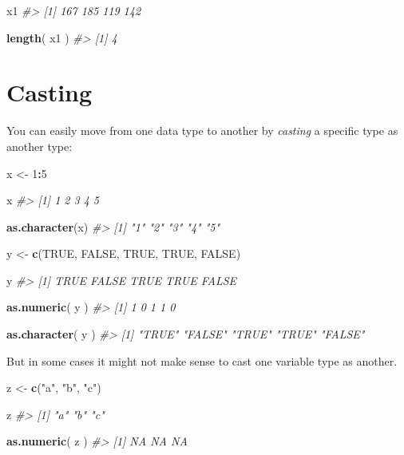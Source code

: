 \documentclass[]{book}
\newenvironment{Shaded}{\begin{snugshade}}{\end{snugshade}}
\newcommand{\CommentTok}[1]{\textcolor[rgb]{0.56,0.35,0.01}{\textit{#1}}}
\newcommand{\DecValTok}[1]{\textcolor[rgb]{0.00,0.00,0.81}{#1}}
\newcommand{\KeywordTok}[1]{\textcolor[rgb]{0.13,0.29,0.53}{\textbf{#1}}}
\newcommand{\NormalTok}[1]{#1}
\newcommand{\OperatorTok}[1]{\textcolor[rgb]{0.81,0.36,0.00}{\textbf{#1}}}
\newcommand{\OtherTok}[1]{\textcolor[rgb]{0.56,0.35,0.01}{#1}}
\newcommand{\StringTok}[1]{\textcolor[rgb]{0.31,0.60,0.02}{#1}}
\theoremstyle{definition}
\theoremstyle{definition}
\theoremstyle{definition}
\theoremstyle{remark}
\begin{document}
\begin{Shaded}
\begin{Highlighting}[]
\NormalTok{x1}
\CommentTok{#> [1] 167 185 119 142}

\KeywordTok{length}\NormalTok{( x1 )}
\CommentTok{#> [1] 4}
\end{Highlighting}
\end{Shaded}

\hypertarget{casting}{%
\section{Casting}\label{casting}}

You can easily move from one data type to another by \emph{casting} a
specific type as another type:

\begin{Shaded}
\begin{Highlighting}[]

\NormalTok{x <-}\StringTok{ }\DecValTok{1}\OperatorTok{:}\DecValTok{5}

\NormalTok{x}
\CommentTok{#> [1] 1 2 3 4 5}

\KeywordTok{as.character}\NormalTok{(x)}
\CommentTok{#> [1] "1" "2" "3" "4" "5"}

\NormalTok{y <-}\StringTok{ }\KeywordTok{c}\NormalTok{(}\OtherTok{TRUE}\NormalTok{, }\OtherTok{FALSE}\NormalTok{, }\OtherTok{TRUE}\NormalTok{, }\OtherTok{TRUE}\NormalTok{, }\OtherTok{FALSE}\NormalTok{)}

\NormalTok{y}
\CommentTok{#> [1]  TRUE FALSE  TRUE  TRUE FALSE}

\KeywordTok{as.numeric}\NormalTok{( y )}
\CommentTok{#> [1] 1 0 1 1 0}

\KeywordTok{as.character}\NormalTok{( y )}
\CommentTok{#> [1] "TRUE"  "FALSE" "TRUE"  "TRUE"  "FALSE"}
\end{Highlighting}
\end{Shaded}

But in some cases it might not make sense to cast one variable type as
another.

\begin{Shaded}
\begin{Highlighting}[]

\NormalTok{z <-}\StringTok{ }\KeywordTok{c}\NormalTok{(}\StringTok{"a"}\NormalTok{, }\StringTok{"b"}\NormalTok{, }\StringTok{"c"}\NormalTok{)}

\NormalTok{z}
\CommentTok{#> [1] "a" "b" "c"}

\KeywordTok{as.numeric}\NormalTok{( z )}
\CommentTok{#> [1] NA NA NA}
\end{Highlighting}
\end{Shaded}
\end{document}
